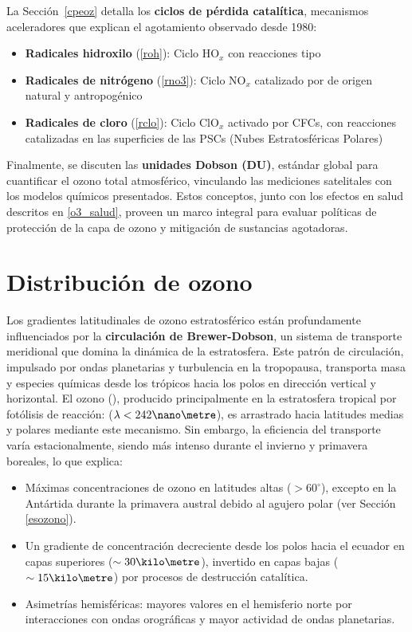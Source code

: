 La Sección~\ref{cpeoz} detalla los \textbf{ciclos de pérdida catalítica}, mecanismos aceleradores que explican el agotamiento observado desde 1980:
\begin{itemize}
    \item \textbf{Radicales hidroxilo} (\ref{roh}): Ciclo HO$_x$ con reacciones tipo 
    \item \textbf{Radicales de nitrógeno} (\ref{rno3}): Ciclo NO$_x$ catalizado por  de origen natural y antropogénico
    \item \textbf{Radicales de cloro} (\ref{rclo}): Ciclo ClO$_x$ activado por CFCs, con reacciones catalizadas en las superficies de las PSCs (Nubes Estratosféricas Polares)
\end{itemize}

Finalmente, se discuten las \textbf{unidades Dobson (DU)}, estándar global para cuantificar el ozono total atmosférico, vinculando las mediciones satelitales con los modelos químicos presentados. Estos conceptos, junto con los efectos en salud descritos en \ref{o3_salud}, proveen un marco integral para evaluar políticas de protección de la capa de ozono y mitigación de sustancias agotadoras.

\section{Distribución de ozono}
\label{dvozono}
Los gradientes latitudinales de ozono estratosférico están profundamente influenciados por la \textbf{circulación de Brewer-Dobson}, un sistema de transporte meridional que domina la dinámica de la estratosfera. Este patrón de circulación, impulsado por ondas planetarias y turbulencia en la tropopausa, transporta masa y especies químicas desde los trópicos hacia los polos en dirección vertical y horizontal. El ozono (), producido principalmente en la estratosfera tropical por fotólisis de  reacción:  ($\lambda < 242\nano\metre$), es arrastrado hacia latitudes medias y polares mediante este mecanismo. Sin embargo, la eficiencia del transporte varía estacionalmente, siendo más intenso durante el invierno y primavera boreales, lo que explica:

\begin{itemize}
    \item Máximas concentraciones de ozono en latitudes altas ($>60^\circ$), excepto en la Antártida durante la primavera austral debido al agujero polar (ver Sección \ref{esozono}).
    \item Un gradiente de concentración decreciente desde los polos hacia el ecuador en capas superiores ($\sim30 \kilo\metre$), invertido en capas bajas ($\sim15 \kilo\metre$) por procesos de destrucción catalítica.
    \item Asimetrías hemisféricas: mayores valores en el hemisferio norte por interacciones con ondas orográficas y mayor actividad de ondas planetarias.
\end{itemize}

